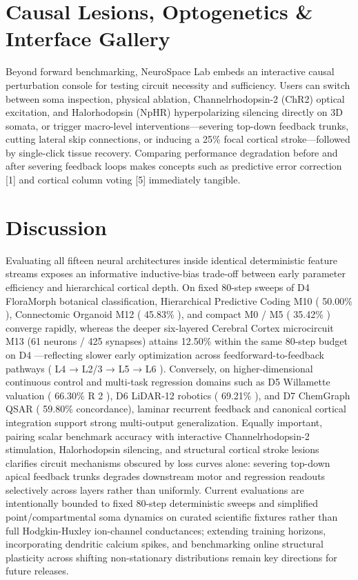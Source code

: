 \documentclass[10pt,letterpaper]{article}
\begin{document}
\section{Causal Lesions, Optogenetics \& Interface Gallery}
Beyond forward benchmarking, NeuroSpace Lab embeds an interactive causal perturbation console for testing circuit necessity and sufficiency. Users can switch between soma inspection, physical ablation, Channelrhodopsin-2 (ChR2) optical excitation, and Halorhodopsin (NpHR) hyperpolarizing silencing directly on 3D somata, or trigger macro-level interventions---severing top-down feedback trunks, cutting lateral skip connections, or inducing a 25\% focal cortical stroke---followed by single-click tissue recovery. Comparing performance degradation before and after severing feedback loops makes concepts such as predictive error correction [1] and cortical column voting [5] immediately tangible.

\section{Discussion}
Evaluating all fifteen neural architectures inside identical deterministic feature streams exposes an informative inductive-bias trade-off between early parameter efficiency and hierarchical cortical depth. On fixed 80-step sweeps of D4 FloraMorph botanical classification, Hierarchical Predictive Coding M10 ( 50.00\% ), Connectomic Organoid M12 ( 45.83\% ), and compact M0 / M5 ( 35.42\% ) converge rapidly, whereas the deeper six-layered Cerebral Cortex microcircuit M13 (61 neurons / 425 synapses) attains 12.50\% within the same 80-step budget on D4 ---reflecting slower early optimization across feedforward-to-feedback pathways ( L4 → L2/3 → L5 → L6 ). Conversely, on higher-dimensional continuous control and multi-task regression domains such as D5 Willamette valuation ( 66.30\% R 2 ), D6 LiDAR-12 robotics ( 69.21\% ), and D7 ChemGraph QSAR ( 59.80\% concordance), laminar recurrent feedback and canonical cortical integration support strong multi-output generalization. Equally important, pairing scalar benchmark accuracy with interactive Channelrhodopsin-2 stimulation, Halorhodopsin silencing, and structural cortical stroke lesions clarifies circuit mechanisms obscured by loss curves alone: severing top-down apical feedback trunks degrades downstream motor and regression readouts selectively across layers rather than uniformly. Current evaluations are intentionally bounded to fixed 80-step deterministic sweeps and simplified point/compartmental soma dynamics on curated scientific fixtures rather than full Hodgkin-Huxley ion-channel conductances; extending training horizons, incorporating dendritic calcium spikes, and benchmarking online structural plasticity across shifting non-stationary distributions remain key directions for future releases.
\end{document}
